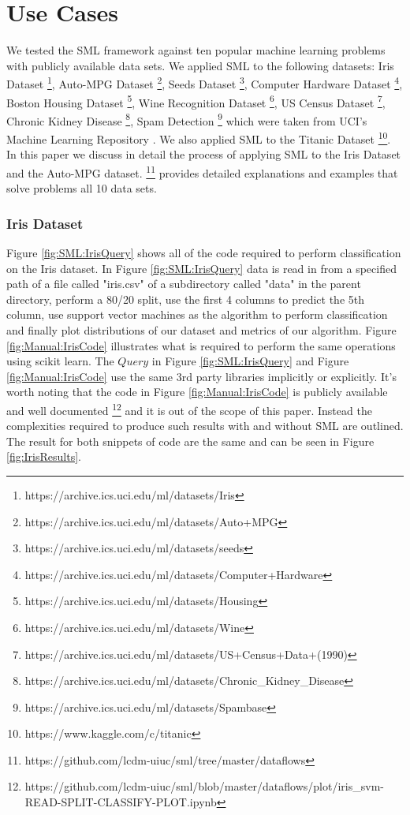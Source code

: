 \documentclass[jair,twoside,11pt,theapa]{article}
\begin{document}
\section{Use Cases}
\label{use-cases}

We tested the SML framework against ten popular machine learning problems with publicly available data sets. We applied SML to the following datasets: Iris Dataset \footnote{https://archive.ics.uci.edu/ml/datasets/Iris}, Auto-MPG Dataset \footnote{https://archive.ics.uci.edu/ml/datasets/Auto+MPG}, Seeds Dataset \footnote{https://archive.ics.uci.edu/ml/datasets/seeds}, Computer Hardware Dataset \footnote{https://archive.ics.uci.edu/ml/datasets/Computer+Hardware}, Boston Housing Dataset \footnote{https://archive.ics.uci.edu/ml/datasets/Housing}, Wine Recognition Dataset \footnote{https://archive.ics.uci.edu/ml/datasets/Wine}, US Census Dataset \footnote{https://archive.ics.uci.edu/ml/datasets/US+Census+Data+(1990)}, Chronic Kidney Disease \footnote{https://archive.ics.uci.edu/ml/datasets/Chronic\_Kidney\_Disease}, Spam Detection \footnote{https://archive.ics.uci.edu/ml/datasets/Spambase} which were taken from UCI's Machine Learning Repository \cite{Lichman:2013}. We also applied SML to the Titanic Dataset \footnote{https://www.kaggle.com/c/titanic}. In this paper we discuss in detail the process of applying SML to the Iris Dataset and the Auto-MPG dataset. \footnote{https://github.com/lcdm-uiuc/sml/tree/master/dataflows} provides detailed explanations and examples that solve problems all 10 data sets.

\subsubsection{Iris Dataset}
Figure \ref{fig:SML:IrisQuery} shows all of the code required to perform classification on the Iris dataset. In Figure \ref{fig:SML:IrisQuery} data is read in from a specified path of a file called "iris.csv" of a subdirectory called "data" in the parent directory, perform a 80/20 split, use the first 4 columns to predict the 5th column, use support vector machines as the algorithm to perform classification and finally plot distributions of our dataset  and metrics of our algorithm. Figure \ref{fig:Manual:IrisCode} illustrates what is required to perform the same operations using scikit learn. The \(Query\) in Figure \ref{fig:SML:IrisQuery} and Figure \ref{fig:Manual:IrisCode} use the same 3rd party libraries implicitly or explicitly. It's worth noting that the code in Figure \ref{fig:Manual:IrisCode} is publicly available and well documented \footnote{https://github.com/lcdm-uiuc/sml/blob/master/dataflows/plot/iris\_svm-READ-SPLIT-CLASSIFY-PLOT.ipynb} and it is out of the scope of this paper. Instead the complexities required to produce such results with and without SML are outlined. The result for both snippets of code are the same and can be seen in Figure \ref{fig:IrisResults}.
\end{document}
